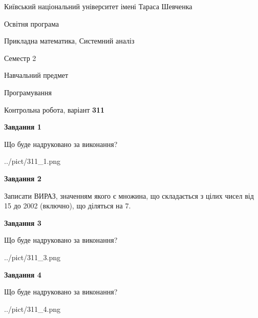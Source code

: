 \documentclass[12pt, ukrainian]{article}
\begin{document}
{{\begin {small}\par
{ \center  Київський національний університет імені Тараса Шевченка \par}
{\parbox {5 cm}{Освітня програма \hfill}{\parbox {8 cm}{Прикладна математика, Системний аналіз \hfill}}\parbox {5 cm}{\hfill Семестр 2}}\par
{\parbox {5 cm} {Навчальний предмет \hfill}\parbox {7 cm}{Програмування \hfill}\parbox {6cm}{\hfill}\par}\vspace{-7pt} \end{small}}{\center Контрольна робота, варіант  \No \textbf
{ 311 }\par}}
{
\begin {large}
{\begin {center}\textbf{Завдання 1}\end {center}}\par
Що буде надруковано за виконання?\par\par
\begin{center}
	{../pict/311_1.png}
\end{center}
\newpage

{\begin {center}\textbf{Завдання 2}\end {center}}\par
Записати ВИРАЗ, значенням якого є множина, що складається з цілих чисел від 15 до 2002 (включно), що діляться на 7.\par
\newpage

{\begin {center}\textbf{Завдання 3}\end {center}}\par
Що буде надруковано за виконання?
\begin{center}
	{../pict/311_3.png}
\end{center}
\newpage

{\begin {center}\textbf{Завдання 4}\end {center}}\par
Що буде надруковано за виконання?\par
\begin{center}
	{../pict/311_4.png}
\end{center}
\newpage


\end{large}}
\end{document}

